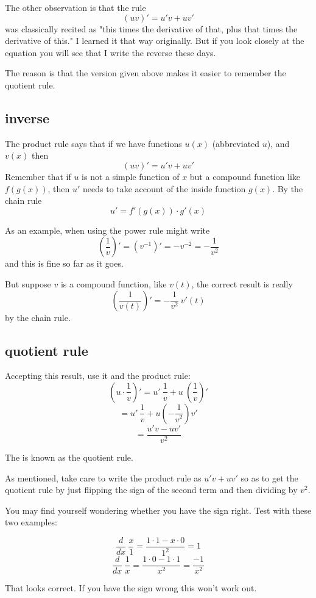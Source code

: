 \documentclass[11pt, oneside]{article}
\begin{document}
The other observation is that the rule
\[ (uv)' = u'v + uv' \]
was classically recited as "this times the derivative of that, plus that times the derivative of this."  I learned it that way originally.  But if you look closely at the equation you will see that I write the reverse these days.  

The reason is that the version given above makes it easier to remember the quotient rule.

\hypertarget{quotient_rule}{}
\subsection*{inverse}
The product rule says that if we have functions $u(x)$ (abbreviated $u$), and $v(x)$ then
\[ (uv)' = u'v + uv' \]
Remember that if $u$ is not a simple function of $x$ but a compound function like $ f(g(x))$,
then $u'$ needs to take account of the inside function $g(x)$.  By the chain rule
\[ u' = f'(g(x)) \cdot g'(x) \]

As an example, when using the power rule might write
\[ (\frac{1}{v})' = (v^{-1})' = -v^{-2} = - \frac{1}{v^2} \]
and this is fine so far as it goes.  

But suppose $v$ is a compound function, like $v(t)$, the correct result is really
\[ (\frac{1}{v(t)})' = - \frac{1}{v^2} \ v'(t) \]
by the chain rule.

\subsection*{quotient rule}

Accepting this result, use it and the product rule:
\[ (u \cdot \frac{1}{v})' = u' \ \frac{1}{v} + u \ (\frac{1}{v})' \]
\[ = u' \ \frac{1}{v} + u (- \frac{1}{v^2}) v' \]
\[ = \frac{u'v - uv'}{v^2} \]

The is known as the quotient rule.

As mentioned, take care to write the product rule as $u'v + uv'$ so as to get the quotient rule by just flipping the sign of the second term and then dividing by $v^2$.

You may find yourself wondering whether you have the sign right.  Test with these two examples:

\[ \frac{d}{dx} \ \frac{x}{1} = \frac{1 \cdot 1 - x \cdot 0}{1^2} = 1 \]
\[ \frac{d}{dx} \ \frac{1}{x} = \frac{1 \cdot 0 - 1 \cdot 1}{x^2} = \frac{-1}{x^2} \]

That looks correct.  If you have the sign wrong this won't work out.
\end{document}
